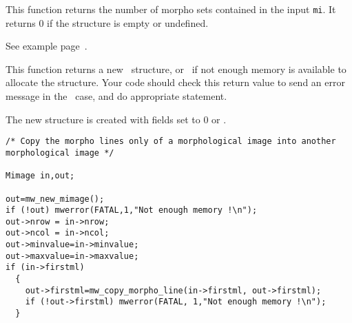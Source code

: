 \newpage %


\Description
This function returns the number of morpho sets contained in the input
\verb+mi+.
It returns $0$ if the structure is empty or undefined.

\Next
\Example
See example page~\pageref{length_ml-example}.

\newpage %


\Description
This function returns a new \mimage\ structure, or \Null\ if not enough 
memory is available to allocate the structure. 
Your code should check this return value to send an error message in the 
\Null\ case, and do appropriate statement.

The new structure is created with fields set to $0$ or \Null.

\Next
\Example
\begin{verbatim}
/* Copy the morpho lines only of a morphological image into another morphological image */

Mimage in,out;

out=mw_new_mimage();
if (!out) mwerror(FATAL,1,"Not enough memory !\n");
out->nrow = in->nrow;
out->ncol = in->ncol;
out->minvalue=in->minvalue;
out->maxvalue=in->maxvalue;
if (in->firstml) 
  {
    out->firstml=mw_copy_morpho_line(in->firstml, out->firstml);
    if (!out->firstml) mwerror(FATAL, 1,"Not enough memory !\n");
  }
\end{verbatim}

\newpage %


